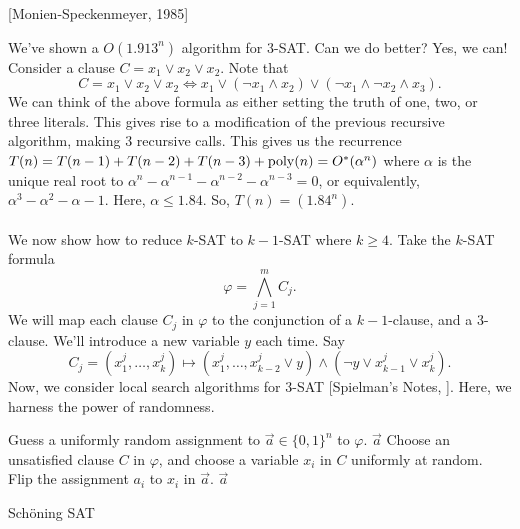         [Monien-Speckenmeyer, 1985]

        We've shown a \(O(1.913^n)\) algorithm for \(3\)-SAT. Can we do better? Yes, we can! Consider a clause \(C=x_1\vee x_2\vee x_2\). Note that
        \begin{equation*}
            C=x_1\vee x_2\vee x_2\iff x_1\vee(\neg x_1\wedge x_2)\vee(\neg x_1\wedge \neg x_2\wedge x_3).
        \end{equation*}
        We can think of the above formula as either setting the truth of one, two, or three literals. This gives rise to a modification of the previous recursive algorithm, making \(3\) recursive calls. This gives us the recurrence \(T(n)=T(n-1)+T(n-2)+T(n-3)+\operatorname{poly}(n)=O^*(\alpha^n)\) where \(\alpha\) is the unique real root to \(\alpha^n-\alpha^{n-1}-\alpha^{n-2}-\alpha^{n-3}=0\), or equivalently, \(\alpha^3-\alpha^2-\alpha-1\). Here, \(\alpha\leq 1.84\). So, \(T(n)=(1.84^n)\).
        \\
        \\
        We now show how to reduce \(k\)-\textsc{SAT} to \(k-1\)-\textsc{SAT} where \(k\geq4\). Take the \(k\)-\textsc{SAT} formula
        \begin{equation*}
            \varphi=\bigwedge_{j=1}^m C_j.
        \end{equation*}
        We will map each clause \(C_j\) in \(\varphi\) to the conjunction of a \(k-1\)-clause, and a \(3\)-clause. We'll introduce a new variable \(y\) each time. Say
        \begin{equation*}
            C_j=(x_1^j,\ldots,x_k^j)\mapsto (x_1^j,\ldots,x_{k-2}^j\vee y)\wedge (\neg y\vee x_{k-1}^j\vee x_k^j).
        \end{equation*}
        Now, we consider local search algorithms for \(3\)-\textsc{SAT} [Spielman's Notes, \cite{schoning1999probabilisticksat}]. Here, we harness the power of randomness.
        \begin{algorithm}[H] 
            \begin{algorithmic}[1]
                    \State Guess a uniformly random assignment to \(\vec{a}\in\{0,1\}^n\) to \(\varphi\).
                            \State \Return \(\vec{a}\)
                        \Else
                            \State Choose an unsatisfied clause \(C\) in \(\varphi\), and choose a variable \(x_i\) in \(C\) uniformly at random.
                            \State Flip the assignment \(a_i\) to \(x_i\) in \(\vec{a}\).
                        \EndIf
                    \EndFor
                    \State \Return \(\vec{a}\)
                \EndProcedure 
            \end{algorithmic}
            \caption{Sch\"oning SAT}
            \label{alg:schoningsat}
        \end{algorithm}
